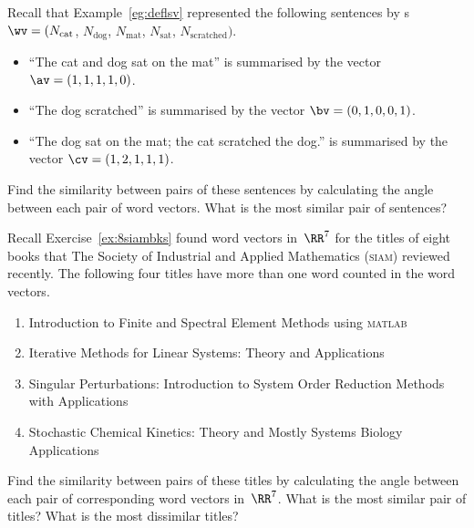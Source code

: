 \begin{exercise} \label{ex:} 
Recall that Example~\ref{eg:deflsv} represented the following sentences by s \(\wv=(N_{\text{cat}}\), \(N_{\text{dog}}\), \(N_{\text{mat}}\), \(N_{\text{sat}}\), \(N_{\text{scratched}})\).
\begin{itemize}
\item ``The cat and dog sat on the mat'' is summarised by the vector \(\av=(1,1,1,1,0)\).
\item ``The dog scratched'' is summarised by the vector \(\bv=(0,1,0,0,1)\).
\item  ``The dog sat on the mat; the cat scratched the dog.'' is summarised by the vector \(\cv=(1,2,1,1,1)\).
\end{itemize}
Find the similarity between pairs of these sentences by calculating the angle between each pair of word vectors.  
What is the most similar pair of sentences?

\end{exercise}



\begin{exercise} \label{ex:} 
Recall Exercise~\ref{ex:8siambks} found word vectors in~\(\RR^7\) for the titles of eight books that The Society of Industrial and Applied Mathematics (\textsc{siam}) reviewed recently.
The following four titles have more than one word counted in the word vectors.
\begin{enumerate}
\item Introduction to Finite and Spectral Element Methods using \textsc{matlab}
\item Iterative Methods for Linear Systems: Theory and Applications 
\item Singular Perturbations: Introduction to System Order Reduction Methods with Applications 
\item Stochastic Chemical Kinetics: Theory and Mostly Systems Biology Applications
\end{enumerate}
Find the similarity between pairs of these titles by calculating the angle between each pair of corresponding word vectors in~\(\RR^7\).  What is the most similar pair of titles?  What is the most dissimilar titles?

\end{exercise}



